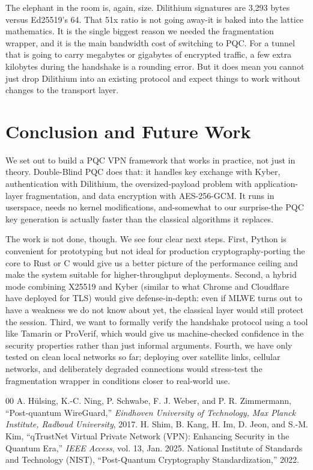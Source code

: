 \documentclass[10pt, conference, letterpaper]{IEEEtran}
\begin{document}
The elephant in the room is, again, size. Dilithium signatures are 3,293 bytes versus Ed25519's 64. That 51x ratio is not going away-it is baked into the lattice mathematics. It is the single biggest reason we needed the fragmentation wrapper, and it is the main bandwidth cost of switching to PQC. For a tunnel that is going to carry megabytes or gigabytes of encrypted traffic, a few extra kilobytes during the handshake is a rounding error. But it does mean you cannot just drop Dilithium into an existing protocol and expect things to work without changes to the transport layer.

\section{Conclusion and Future Work}
We set out to build a PQC VPN framework that works in practice, not just in theory. Double-Blind PQC does that: it handles key exchange with Kyber, authentication with Dilithium, the oversized-payload problem with application-layer fragmentation, and data encryption with AES-256-GCM. It runs in userspace, needs no kernel modifications, and-somewhat to our surprise-the PQC key generation is actually faster than the classical algorithms it replaces.

The work is not done, though. We see four clear next steps. First, Python is convenient for prototyping but not ideal for production cryptography-porting the core to Rust or C would give us a better picture of the performance ceiling and make the system suitable for higher-throughput deployments. Second, a hybrid mode combining X25519 and Kyber (similar to what Chrome and Cloudflare have deployed for TLS) would give defense-in-depth: even if MLWE turns out to have a weakness we do not know about yet, the classical layer would still protect the session. Third, we want to formally verify the handshake protocol using a tool like Tamarin or ProVerif, which would give us machine-checked confidence in the security properties rather than just informal arguments. Fourth, we have only tested on clean local networks so far; deploying over satellite links, cellular networks, and deliberately degraded connections would stress-test the fragmentation wrapper in conditions closer to real-world use.

\begin{thebibliography}{00}
 A. H\"ulsing, K.-C. Ning, P. Schwabe, F. J. Weber, and P. R. Zimmermann, ``Post-quantum WireGuard,'' \textit{Eindhoven University of Technology, Max Planck Institute, Radboud University}, 2017.
 H. Shim, B. Kang, H. Im, D. Jeon, and S.-M. Kim, ``qTrustNet Virtual Private Network (VPN): Enhancing Security in the Quantum Era,'' \textit{IEEE Access}, vol. 13, Jan. 2025. 
 National Institute of Standards and Technology (NIST), ``Post-Quantum Cryptography Standardization,'' 2022.
\end{thebibliography}
\end{document}
